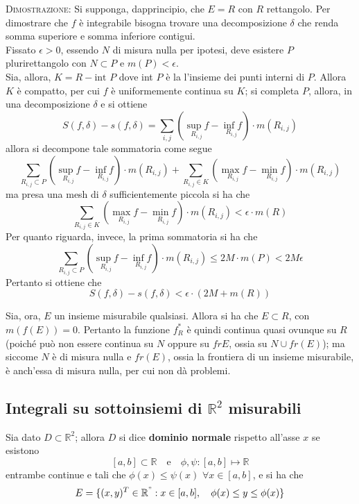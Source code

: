 \documentclass[a4paper]{extarticle}
\begin{document}
\vspace{2em}
\noindent
\normalfont \normalsize
\textsc{Dimostrazione}: Si supponga, dapprincipio, che $E = R$ con $R$ rettangolo. Per dimostrare che $f$ è integrabile bisogna trovare una decomposizione $\delta$ che renda somma superiore e somma inferiore contigui.\\
Fissato $\epsilon > 0$, essendo $N$ di misura nulla per ipotesi, deve esistere $P$ plurirettangolo con $N \subset P$ e $m(P) < \epsilon$.\\
Sia, allora, $K=R-\text{int }P$ dove int $P$ è la l'insieme dei punti interni di $P$. Allora $K$ è compatto, per cui $f$ è uniformemente continua su $K$; si completa $P$, allora, in una decomposizione $\delta$ e si ottiene
\[S(f,\delta)-s(f,\delta) = \sum_{i,j} \left(\underset{R_{i,j}}{\sup f} - \underset{R_{i,j}}{\inf f}\right) \cdot m(R_{i,j})\]
allora si decompone tale sommatoria come segue
\[\sum_{R_{i,j} \subset P} \left(\underset{R_{i,j}}{\sup f} - \underset{R_{i,j}}{\inf f}\right) \cdot m(R_{i,j}) + \sum_{R_{i,j} \in K} \left(\underset{R_{i,j}}{\max f} - \underset{R_{i,j}}{\min f}\right) \cdot m(R_{i,j})\]
ma presa una mesh di $\delta$ sufficientemente piccola si ha che 
\[\sum_{R_{i,j} \in K} \left(\underset{R_{i,j}}{\max f} - \underset{R_{i,j}}{\min f}\right) \cdot m(R_{i,j}) < \epsilon \cdot m(R)\]
Per quanto riguarda, invece, la prima sommatoria si ha che
\[\sum_{R_{i,j} \subset P} \left(\underset{R_{i,j}}{\sup f} - \underset{R_{i,j}}{\inf f}\right) \cdot m(R_{i,j}) \leq 2 M \cdot m(P) < 2M\epsilon\]
Pertanto si ottiene che
\[S(f,\delta)-s(f,\delta) < \epsilon \cdot (2M + m(R))\]

\vspace{1em}
\noindent
Sia, ora, $E$ un insieme misurabile qualsiasi. Allora si ha che $E \subset R$, con $m(f(E)) = 0$. Pertanto la funzione $f^*_R$ è quindi continua quasi ovunque su $R$ (poiché può non essere continua su $N$ oppure su $fr E$, ossia su $N \cup fr(E)$); ma siccome $N$ è di misura nulla e $fr(E)$, ossia la frontiera di un insieme misurabile, è anch'essa di misura nulla, per cui non dà problemi.

\vspace{1em}
\noindent
\subsection{Integrali su sottoinsiemi di $\mathbb{R}^2$ misurabili}
Sia dato $D \subset \mathbb{R}^2$; allora $D$ si dice \textbf{dominio normale} rispetto all'asse $x$ se esistono
\[[a,b] \subset \mathbb{R} \hspace{1em} \text{e} \hspace{1em} \phi,\psi : [a,b] \longmapsto \mathbb{R}\]
entrambe continue e tali che $\phi(x) \leq \psi(x)$ $\forall x \in [a,b]$, e si ha che
\[E = \{(x,y){^T} \in \mathbb{R}^" : x \in [a,b], \hspace{1em} \phi(x) \leq y \leq \phi(x)\}\]
\end{document}
